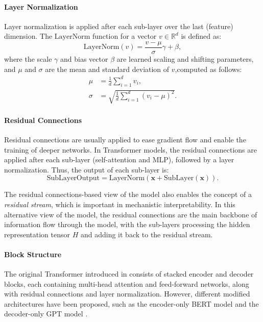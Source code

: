 \paragraph{Layer Normalization}
Layer normalization \parencite{ba_layer_2016} is applied after each sub-layer over the last (feature) dimension. The $\text{LayerNorm}$ function for a vector $v \in \mathbb{R}^d$ is defined as:
\begin{equation*}
    \text{LayerNorm}(v) = \frac{v - \mu}{\sigma}\gamma + \beta,
\end{equation*}
where the scale $\gamma$ and bias vector $\beta$ are learned scaling and shifting parameters, and $\mu$ and $\sigma$ are the mean and standard deviation of $v$,computed as follows:
\begin{align*}
    \mu    & = \frac{1}{d} \sum_{i=1}^{d} v_i,                  \\
    \sigma & = \sqrt{\frac{1}{d} \sum_{i=1}^{d} (v_i - \mu)^2}.
\end{align*}

\paragraph{Residual Connections}
Residual connections \parencite{he_deep_2016} are usually applied to ease gradient flow and enable the training of deeper networks. In Transformer models, the residual connections are applied after each sub-layer (self-attention and MLP), followed by a layer normalization. Thus, the output of each sub-layer is:
\begin{equation*}
    \text{SubLayerOutput} = \text{LayerNorm}(\mathbf{x} + \text{SubLayer}(\mathbf{x})).
\end{equation*}

The residual connections-based view of the model also enables the concept of a \emph{residual stream}, which is important in mechanistic interpretability. In this alternative view of the model, the residual connections are the main backbone of information flow through the model, with the sub-layers processing the hidden representation tensor $H$ and adding it back to the residual stream.

\paragraph{Block Structure}
The original Transformer introduced in \cite{vaswani_attention_2017} consists of stacked encoder and decoder blocks, each containing multi-head attention and feed-forward networks, along with residual connections and layer normalization. However, different modified architectures have been proposed, such as the encoder-only BERT model \parencite{devlin_bert_2019} and the decoder-only GPT model \parencite{radford_improving_2018}.

